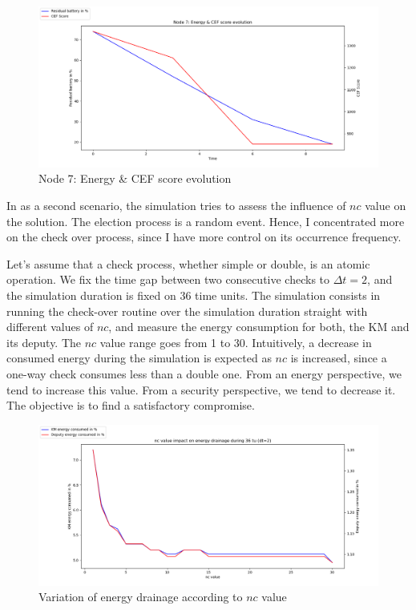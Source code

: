 \begin{figure}[htbp]
	\centerline{\includegraphics[scale=0.35]{figures/simulation/energy_cef_evolution.png}}
	\caption{Node 7: Energy \& CEF score evolution}
	\label{fig:sim_exmp1}
\end{figure}

In as a second scenario, the simulation tries to assess the influence of $nc$ value on the solution. The election process is a random event. Hence, I concentrated more on the check over process, since I have more control on its occurrence frequency.

Let's assume that a check process, whether simple or double, is an atomic operation. We fix the time gap between two consecutive checks to $\Delta t = 2$, and the simulation duration is fixed on 36 time units. The simulation consists in running the check-over routine over the simulation duration straight with different values of $nc$, and measure the energy consumption for both, the KM and its deputy. The $nc$ value range goes from 1 to 30. Intuitively, a decrease in consumed energy during the simulation is expected as $nc$ is increased, since a one-way check consumes less than a double one. From an energy perspective, we tend to increase this value. From a security perspective, we tend to decrease it. The objective is to find a satisfactory compromise.

\begin{figure}[htbp]
	\centerline{\includegraphics[scale=0.35]{figures/simulation/nc_energy.png}}
	\caption{Variation of energy drainage according to $nc$ value}
	\label{fig:sim_nc_impact}
\end{figure}

